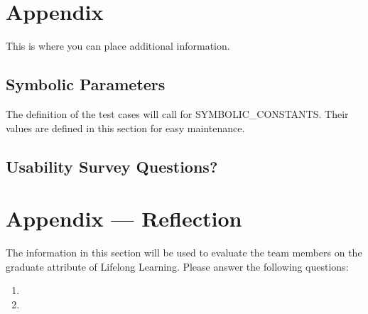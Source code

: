 \documentclass[12pt, titlepage]{article}
\begin{document}
\newpage

\section{Appendix}

This is where you can place additional information.

\subsection{Symbolic Parameters}

The definition of the test cases will call for SYMBOLIC\_CONSTANTS.
Their values are defined in this section for easy maintenance.

\subsection{Usability Survey Questions?}


\newpage{}
\section*{Appendix --- Reflection}

The information in this section will be used to evaluate the team members on the
graduate attribute of Lifelong Learning.  Please answer the following questions:

\begin{enumerate}
  \item 
  \item 
\end{enumerate}
\end{document}
